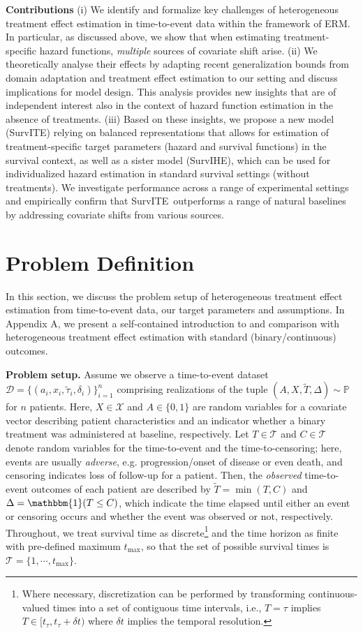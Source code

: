 \documentclass{article}
\newcommand{\Xc}{{\mathcal X}}
\newcommand{\Tc}{{\mathcal T}}
\newcommand{\data}{{\mathcal D}}
\newcommand{\one}{{\mathbbm{1}}}
\newcommand{\proposed}{{SurvITE}}
\newcommand{\tmax}{{t_{\text{max}}}}
\begin{document}
\textbf{Contributions} (i) We identify and formalize key challenges of  heterogeneous treatment effect estimation in time-to-event data within the framework of  ERM. In particular, as discussed above, we show that when estimating treatment-specific hazard functions, \textit{multiple} sources of covariate shift arise. (ii) We theoretically analyse their effects by adapting recent generalization bounds from domain adaptation and treatment effect estimation to our setting and discuss implications for model design. This analysis provides new insights that are of independent interest also in the context of hazard function estimation in the absence of treatments. (iii) Based on these insights, we propose a new model (\proposed) relying on balanced representations that allows for estimation of treatment-specific target parameters (hazard and survival functions) in the survival context, as well as a sister model (SurvIHE), which can be used for individualized hazard estimation in standard survival settings (without treatments). We investigate performance across a range of experimental settings and empirically confirm that \proposed~outperforms a range of natural baselines by addressing covariate shifts from various sources.

\section{Problem Definition} \label{sec:problem_definition}
In this section, we discuss the problem setup of heterogeneous treatment effect estimation from time-to-event data, our target parameters and assumptions. In Appendix A, we present a self-contained introduction to and comparison with heterogeneous treatment effect estimation with standard (binary/continuous) outcomes.

\textbf{Problem setup.} Assume we observe a time-to-event dataset $\data = \{ (a_{i}, x_{i}, \tilde{\tau}_{i}, \delta_{i}) \}_{i=1}^{n}$ comprising realizations of the tuple $(A, X, \tilde{T}, \Delta) \sim \mathbb{P}$ for $n$ patients. 
Here, $X \in \Xc$ and $A \in \{0,1\}$ are random variables for a covariate vector describing patient characteristics and an indicator whether a binary treatment was administered at baseline, respectively.
Let $T \in \Tc$ and $C \in \Tc$ denote random variables for the time-to-event and the time-to-censoring; here, events are usually \textit{adverse}, e.g. progression/onset of disease or even death, and censoring indicates loss of follow-up for a patient. Then, the \textit{observed} time-to-event outcomes of each patient are described by $\tilde{T} = \min (T, C)$ and $\Delta = \one(T \leq C)$, which indicate the time elapsed until either an event or censoring occurs and whether the event was observed or not, respectively. 
Throughout, we treat survival time as discrete\footnote{Where necessary, discretization can be performed by transforming continuous-valued times into a set of contiguous time intervals, i.e., $T = \tau$ implies $T \in [t_{\tau}, t_{\tau} + \delta t)$ where $\delta t$ implies the temporal resolution.} and the time horizon as finite with pre-defined maximum $\tmax$, so that the set of possible survival times is $\Tc = \{1, \cdots, \tmax\}$. 
\end{document}
